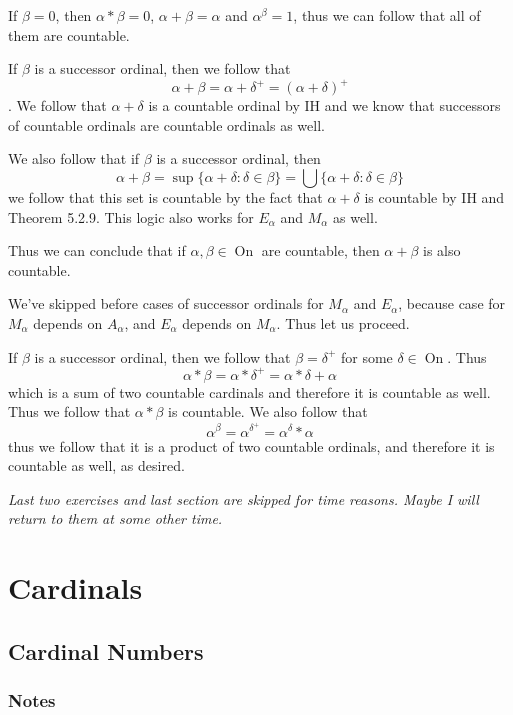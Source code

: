 \documentclass[11pt,oneside,titlepage]{book}
\DeclareMathOperator \On {On}
\newcommand{\set}[1]{\{ #1 \}}
\begin{document}
If $\beta = 0$, then $\alpha * \beta = 0$, $\alpha + \beta = \alpha$ and $\alpha^\beta = 1$,
thus we can follow that all of them are countable.

If $\beta$ is a successor ordinal, then we follow that
$$\alpha + \beta = \alpha + \delta^+ = (\alpha + \delta)^+$$.
We follow that $\alpha + \delta$ is a countable ordinal by IH and we know that
successors of countable ordinals are countable ordinals as well.

We also follow that if $\beta$ is a successor ordinal, then
$$\alpha + \beta = \sup\set{\alpha + \delta: \delta \in \beta} =
\bigcup\set{\alpha + \delta: \delta \in \beta} $$
we follow that this set is countable by the fact that $\alpha + \delta$ is countable
by IH and Theorem 5.2.9. This logic also works for $E_\alpha$ and $M_\alpha$ as well.

Thus we can conclude that if $\alpha, \beta \in \On$ are countable, then $\alpha + \beta$
is also countable.

We've skipped before cases of successor ordinals for $M_\alpha$ and $E_\alpha$,
because case for $M_\alpha$ depends on $A_\alpha$, and $E_\alpha$ depends on $M_\alpha$.
Thus let us proceed. 

If $\beta$ is a successor ordinal, then we follow that $\beta = \delta^+$ for
some $\delta \in \On$. Thus
$$\alpha * \beta = \alpha * \delta^+ = \alpha * \delta + \alpha$$
which is a sum of two countable cardinals and therefore it is countable as well.
Thus we follow that $\alpha * \beta$ is countable.
We also follow that
$$\alpha ^\beta = \alpha^{\delta^+} = \alpha^\delta * \alpha$$
thus we follow that it is a product of two countable ordinals, and therefore it is
countable as well, as desired.

\textit{Last two exercises and last section are skipped for time reasons. Maybe I will
  return to them at some other time.}

\chapter{Cardinals}

\section{Cardinal Numbers}

\subsection*{Notes}
\end{document}
